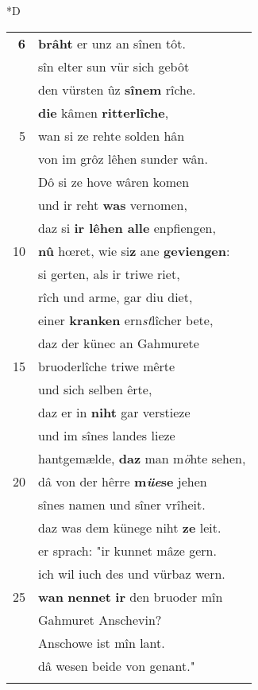 \documentclass[8pt,a4paper,notitlepage]{article}
\begin{document}
\begin{table}[ht]
\begin{minipage}[t]{0.5\linewidth}
\small
\begin{center}*D
\end{center}
\begin{tabular}{rl}
\textbf{6} & \textbf{brâht} er unz an sînen tôt.\\ 
 & sîn elter sun vür sich gebôt\\ 
 & den vürsten ûz \textbf{sînem} rîche.\\ 
 & \textbf{die} kâmen \textbf{ritterlîche},\\ 
5 & wan si ze rehte solden hân\\ 
 & von im grôz lêhen sunder wân.\\ 
 & Dô si ze hove wâren komen\\ 
 & und ir reht \textbf{was} vernomen,\\ 
 & daz si \textbf{ir lêhen alle} enpfiengen,\\ 
10 & \textbf{nû} hœret, wie si\textbf{z} ane \textbf{geviengen}:\\ 
 & si gerten, als ir triwe riet,\\ 
 & rîch und arme, gar diu diet,\\ 
 & einer \textbf{kranken} ern\textit{st}lîcher bete,\\ 
 & daz der künec an Gahmurete\\ 
15 & bruoderlîche triwe mêrte\\ 
 & und sich selben êrte,\\ 
 & daz er in \textbf{niht} gar verstieze\\ 
 & und im sînes landes lieze\\ 
 & hantgemælde, \textbf{daz} man m\textit{ö}hte sehen,\\ 
20 & dâ von der hêrre \textbf{m\textit{üe}se} jehen\\ 
 & sînes namen und sîner vrîheit.\\ 
 & daz was dem künege niht \textbf{ze} leit.\\ 
 & er sprach: "ir kunnet mâze gern.\\ 
 & ich wil iuch des und vürbaz wern.\\ 
25 & \textbf{wan} \textbf{nennet} \textbf{ir} den bruoder mîn\\ 
 & Gahmuret Anschevin?\\ 
 & Anschowe ist mîn lant.\\ 
 & dâ wesen beide von genant."\\ 
 & \textbf{\begin{large}D\end{large}ô} sprach der künec hêre:\\ 

\end{tabular}
\end{minipage}
\end{table}
\end{document}
